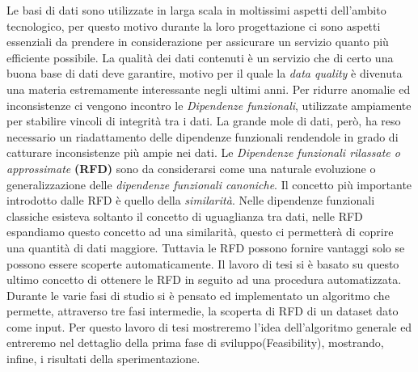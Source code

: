 Le basi di dati sono utilizzate in larga scala in moltissimi aspetti dell'ambito tecnologico, per questo motivo durante la loro progettazione ci sono aspetti essenziali da prendere in considerazione per assicurare un servizio quanto più efficiente possibile.
La qualità dei dati contenuti è un servizio che di certo una buona base di dati deve garantire, motivo per il quale la \emph{data quality} è divenuta una materia estremamente interessante negli ultimi anni. 
Per ridurre anomalie ed inconsistenze ci vengono incontro le \emph{Dipendenze funzionali}, utilizzate ampiamente per stabilire vincoli di integrità tra i dati.
La grande mole di dati, però, ha reso necessario un riadattamento delle dipendenze funzionali rendendole in grado di catturare inconsistenze più ampie nei dati. 
Le \emph{Dipendenze funzionali rilassate o approssimate} \textbf{(RFD)} sono da considerarsi come una naturale evoluzione o generalizzazione delle \emph{dipendenze funzionali canoniche}.
Il concetto più importante introdotto dalle RFD è quello della \emph{similarità}.
Nelle dipendenze funzionali classiche esisteva soltanto il concetto di uguaglianza tra dati, nelle RFD espandiamo questo concetto ad una similarità, questo ci permetterà di coprire una quantità di dati maggiore.
Tuttavia le RFD possono fornire vantaggi solo se possono essere scoperte automaticamente.
Il lavoro di tesi si è basato su questo ultimo concetto di ottenere le RFD in seguito ad una procedura automatizzata.
Durante le varie fasi di studio si è pensato ed implementato un algoritmo che permette, attraverso tre fasi intermedie, la scoperta di RFD di un dataset dato come input.
Per questo lavoro di tesi mostreremo l'idea dell'algoritmo generale ed entreremo nel dettaglio della prima fase di sviluppo(Feasibility), mostrando, infine, i risultati della sperimentazione.
